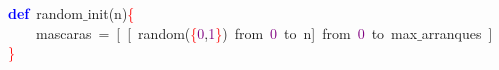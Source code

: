 \noindent
\mbox{}\textbf{\textcolor{Blue}{def}}\ random$\_$init\textcolor{BrickRed}{(}n\textcolor{BrickRed}{)}\textcolor{Red}{\{} \\
\mbox{}\ \ \ \ mascaras\ \textcolor{BrickRed}{=}\ \textcolor{BrickRed}{[}\ \textcolor{BrickRed}{[}\ random\textcolor{BrickRed}{(}\textcolor{Red}{\{}\textcolor{Purple}{0}\textcolor{BrickRed}{,}\textcolor{Purple}{1}\textcolor{Red}{\}}\textcolor{BrickRed}{)}\ from\ \textcolor{Purple}{0}\ to\ n\textcolor{BrickRed}{]}\ from\ \textcolor{Purple}{0}\ to\ max$\_$arranques\ \textcolor{BrickRed}{]} \\
\mbox{}\textcolor{Red}{\}} \\
\mbox{}
